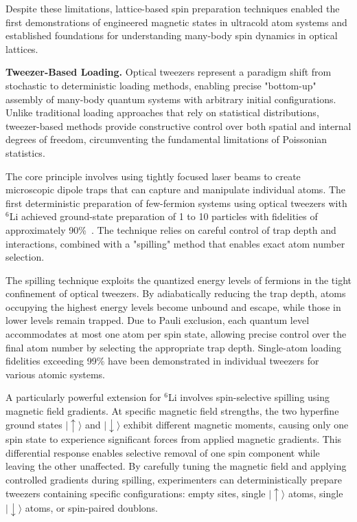 Despite these limitations, lattice-based spin preparation techniques enabled the first demonstrations of engineered magnetic states in ultracold atom systems and established foundations for understanding many-body spin dynamics in optical lattices.


\textbf{Tweezer-Based Loading.} Optical tweezers represent a paradigm shift from stochastic to deterministic loading methods, enabling precise "bottom-up" assembly of many-body quantum systems with arbitrary initial configurations. Unlike traditional loading approaches that rely on statistical distributions, tweezer-based methods provide constructive control over both spatial and internal degrees of freedom, circumventing the fundamental limitations of Poissonian statistics.

The core principle involves using tightly focused laser beams to create microscopic dipole traps that can capture and manipulate individual atoms. The first deterministic preparation of few-fermion systems using optical tweezers with $^6$Li achieved ground-state preparation of 1 to 10 particles with fidelities of approximately 90\%~\cite{serwane_deterministic_2011}. The technique relies on careful control of trap depth and interactions, combined with a "spilling" method that enables exact atom number selection.

The spilling technique exploits the quantized energy levels of fermions in the tight confinement of optical tweezers. By adiabatically reducing the trap depth, atoms occupying the highest energy levels become unbound and escape, while those in lower levels remain trapped. Due to Pauli exclusion, each quantum level accommodates at most one atom per spin state, allowing precise control over the final atom number by selecting the appropriate trap depth. Single-atom loading fidelities exceeding 99\% have been demonstrated in individual tweezers for various atomic systems.

A particularly powerful extension for $^6$Li involves spin-selective spilling using magnetic field gradients. At specific magnetic field strengths, the two hyperfine ground states $|\uparrow\rangle$ and $|\downarrow\rangle$ exhibit different magnetic moments, causing only one spin state to experience significant forces from applied magnetic gradients. This differential response enables selective removal of one spin component while leaving the other unaffected. By carefully tuning the magnetic field and applying controlled gradients during spilling, experimenters can deterministically prepare tweezers containing specific configurations: empty sites, single $|\uparrow\rangle$ atoms, single $|\downarrow\rangle$ atoms, or spin-paired doublons.

